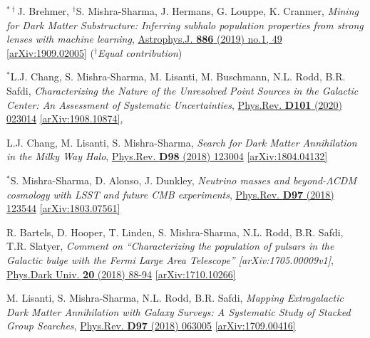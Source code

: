 \documentclass[letterpaper,11pt]{article}
\newenvironment{packed_enumerate}[1][]{
\begin{etaremune}[#1]
  \setlength{\itemsep}{3.9pt}
  \setlength{\parskip}{0pt}
  \setlength{\parsep}{0pt}}{\end{etaremune}
}
\begin{document}
\begin{packed_enumerate}[start=26]
  \item $^{*\dagger}$J. Brehmer, $^\dagger$S. Mishra-Sharma, J. Hermans, G. Louppe, K. Cranmer, \emph{Mining for Dark Matter Substructure: Inferring subhalo population properties from strong lenses with machine learning}, \href{https://iopscience.iop.org/article/10.3847/1538-4357/ab4c41}{Astrophys.J. \textbf{886} (2019) no.1, 49} \href{https://arxiv.org/abs/1909.02005}{[arXiv:1909.02005]} ($^\dagger$\emph{Equal contribution})

  \item $^*$L.J. Chang, S. Mishra-Sharma, M. Lisanti, M. Buschmann, N.L. Rodd, B.R. Safdi, \emph{Characterizing the Nature of the Unresolved Point Sources in the Galactic Center: An Assessment of Systematic Uncertainties},  \href{https://journals.aps.org/prd/abstract/10.1103/PhysRevD.101.023014}{Phys.Rev. \textbf{D101} (2020) 023014} \href{https://arxiv.org/abs/1908.10874}{[arXiv:1908.10874]}, 

  \item L.J. Chang, M. Lisanti, S. Mishra-Sharma, \emph{Search for Dark Matter Annihilation in the Milky Way Halo}, \href{https://journals.aps.org/prd/abstract/10.1103/PhysRevD.98.123004}{Phys.Rev. \textbf{D98} (2018) 123004} \href{https://arxiv.org/abs/1804.04132}{[arXiv:1804.04132]}

  \item $^*$S. Mishra-Sharma, D. Alonso, J. Dunkley, \emph{Neutrino masses and beyond-$\Lambda$CDM cosmology with LSST and future CMB experiments}, \href{https://journals.aps.org/prd/abstract/10.1103/PhysRevD.97.123544}{Phys.Rev. \textbf{D97} (2018) 123544}  \href{https://arxiv.org/abs/1803.07561}{[arXiv:1803.07561]}

  \item R. Bartels, D. Hooper, T. Linden, S. Mishra-Sharma, N.L. Rodd, B.R. Safdi, T.R. Slatyer, \emph{Comment on ``Characterizing the population of pulsars in the Galactic bulge with the
  {\it Fermi} Large Area Telescope'' [arXiv:1705.00009\MakeLowercase{v}1]}, \href{https://www.sciencedirect.com/science/article/pii/S2212686418300268}{Phys.Dark Univ. \textbf{20} (2018) 88-94} \href{https://arxiv.org/abs/1710.10266}{[arXiv:1710.10266]}

  \item M. Lisanti, S. Mishra-Sharma, N.L. Rodd, B.R. Safdi, \emph{Mapping Extragalactic Dark Matter Annihilation with Galaxy Surveys: A Systematic Study of Stacked Group Searches},  \href{https://journals.aps.org/prd/abstract/10.1103/PhysRevD.97.063005}{Phys.Rev. \textbf{D97} (2018) 063005} \href{https://arxiv.org/abs/1709.00416}{[arXiv:1709.00416]}


\end{packed_enumerate}
\end{document}

